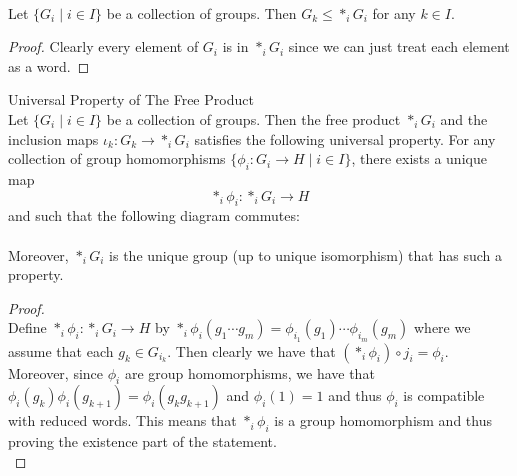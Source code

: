 \documentclass[a4paper]{article}
\begin{document}
\begin{prp}{}{}\\
Let $\{G_i\;|\;i\in I\}$ be a collection of groups. Then $G_k\leq\ast_iG_i$ for any $k\in I$. 
\begin{proof}
Clearly every element of $G_i$ is in $\ast_iG_i$ since we can just treat each element as a word. 
\end{proof}
\end{prp}

\begin{prp}{Universal Property of The Free Product}{}\\
Let $\{G_i\;|\;i\in I\}$ be a collection of groups. Then the free product $\ast_i G_i$ and the inclusion maps $\iota_k:G_k\to\ast_i G_i$ satisfies the following universal property. For any collection of group homomorphisms $\{\phi_i:G_i\to H\;|\;i\in I\}$, there exists a unique map $$\ast_i\phi_i:\ast_i G_i\to H$$ and such that the following diagram commutes: \\
 \\
Moreover, $\ast_i G_i$ is the unique group (up to unique isomorphism) that has such a property. 
\begin{proof}\\
Define $\ast_i\phi_i:\ast_iG_i\to H$ by $\ast_i\phi_i(g_1\cdots g_m)=\phi_{i_1}(g_1)\cdots\phi_{i_m}(g_m)$ where we assume that each $g_k\in G_{i_k}$. Then clearly we have that $(\ast_i\phi_i)\circ j_i=\phi_i$. Moreover, since $\phi_i$ are group homomorphisms, we have that $\phi_i(g_k)\phi_i(g_{k+1})=\phi_i(g_kg_{k+1})$ and $\phi_i(1)=1$ and thus $\phi_i$ is compatible with reduced words. This means that $\ast_i\phi_i$ is a group homomorphism and thus proving the existence part of the statement. \\


\end{proof}
\end{prp}
\end{document}
